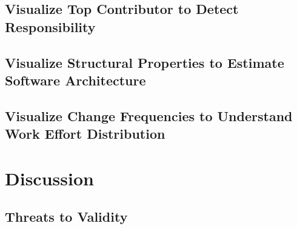\documentclass[conference]{IEEEtran}
\begin{document}
\subsection{Visualize Top Contributor to Detect Responsibility}

\subsection{Visualize Structural Properties to Estimate Software Architecture}

\subsection{Visualize Change Frequencies to Understand Work Effort Distribution}


\section{Discussion}

\subsection{Threats to Validity}





\end{document}
